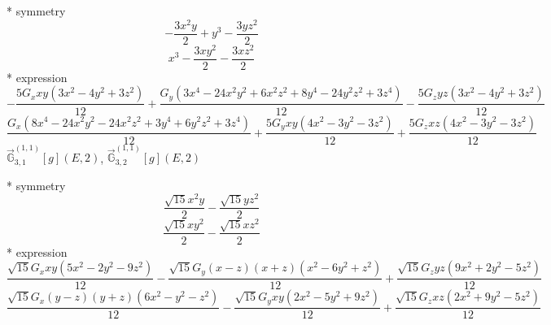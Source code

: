 \documentclass[fleqn,8pt]{jsarticle}
\begin{document}
\noindent\quad ** symmetry
\begin{dmath*}
- \frac{3 x^{2} y}{2} + y^{3} - \frac{3 y z^{2}}{2}
\end{dmath*}
\begin{dmath*}
x^{3} - \frac{3 x y^{2}}{2} - \frac{3 x z^{2}}{2}
\end{dmath*}
\noindent\quad ** expression
\begin{dmath*}
- \frac{5 G_{x} x y \left(3 x^{2} - 4 y^{2} + 3 z^{2}\right)}{12} + \frac{G_{y} \left(3 x^{4} - 24 x^{2} y^{2} + 6 x^{2} z^{2} + 8 y^{4} - 24 y^{2} z^{2} + 3 z^{4}\right)}{12} - \frac{5 G_{z} y z \left(3 x^{2} - 4 y^{2} + 3 z^{2}\right)}{12}
\end{dmath*}
\begin{dmath*}
\frac{G_{x} \left(8 x^{4} - 24 x^{2} y^{2} - 24 x^{2} z^{2} + 3 y^{4} + 6 y^{2} z^{2} + 3 z^{4}\right)}{12} + \frac{5 G_{y} x y \left(4 x^{2} - 3 y^{2} - 3 z^{2}\right)}{12} + \frac{5 G_{z} x z \left(4 x^{2} - 3 y^{2} - 3 z^{2}\right)}{12}
\end{dmath*}
\noindent\quad $\vec{\mathbb{G}}_{3,1}^{(1,1)}[g](E,2)$, $\vec{\mathbb{G}}_{3,2}^{(1,1)}[g](E,2)$

\noindent\quad ** symmetry
\begin{dmath*}
\frac{\sqrt{15} x^{2} y}{2} - \frac{\sqrt{15} y z^{2}}{2}
\end{dmath*}
\begin{dmath*}
\frac{\sqrt{15} x y^{2}}{2} - \frac{\sqrt{15} x z^{2}}{2}
\end{dmath*}
\noindent\quad ** expression
\begin{dmath*}
\frac{\sqrt{15} G_{x} x y \left(5 x^{2} - 2 y^{2} - 9 z^{2}\right)}{12} - \frac{\sqrt{15} G_{y} \left(x - z\right) \left(x + z\right) \left(x^{2} - 6 y^{2} + z^{2}\right)}{12} + \frac{\sqrt{15} G_{z} y z \left(9 x^{2} + 2 y^{2} - 5 z^{2}\right)}{12}
\end{dmath*}
\begin{dmath*}
\frac{\sqrt{15} G_{x} \left(y - z\right) \left(y + z\right) \left(6 x^{2} - y^{2} - z^{2}\right)}{12} - \frac{\sqrt{15} G_{y} x y \left(2 x^{2} - 5 y^{2} + 9 z^{2}\right)}{12} + \frac{\sqrt{15} G_{z} x z \left(2 x^{2} + 9 y^{2} - 5 z^{2}\right)}{12}
\end{dmath*}
\end{document}

